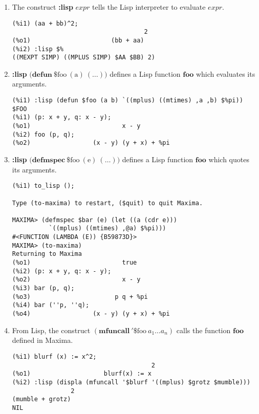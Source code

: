 \documentclass[12pt]{article}
\begin{document}
\begin{enumerate}

\item The construct {\bf :lisp} $\mathit{expr}$ tells the Lisp interpreter
to evaluate $\mathit{expr}$.

\begin{verbatim}
(%i1) (aa + bb)^2;
                                    2
(%o1)                      (bb + aa)
(%i2) :lisp $%
((MEXPT SIMP) ((MPLUS SIMP) $AA $BB) 2)
\end{verbatim}

\item {\bf :lisp} $\mathrm{(}\mathbf{defun\ } \mathrm{\$foo\ (a)\ (\ldots))}$
defines a Lisp function $\mathbf{foo}$ which evaluates its arguments.

\begin{verbatim}
(%i1) :lisp (defun $foo (a b) `((mplus) ((mtimes) ,a ,b) $%pi))
$FOO
(%i1) (p: x + y, q: x - y);
(%o1)                         x - y
(%i2) foo (p, q);
(%o2)                 (x - y) (y + x) + %pi
\end{verbatim}

\item {\bf :lisp} $\mathrm{(}\mathbf{defmspec\ } \mathrm{\$foo\ (e)\ (\ldots))}$
defines a Lisp function $\mathbf{foo}$ which quotes its arguments.
\begin{verbatim}
(%i1) to_lisp ();

Type (to-maxima) to restart, ($quit) to quit Maxima.

MAXIMA> (defmspec $bar (e) (let ((a (cdr e)))
          `((mplus) ((mtimes) ,@a) $%pi)))
#<FUNCTION (LAMBDA (E)) {B59873D}>
MAXIMA> (to-maxima)
Returning to Maxima
(%o1)                         true
(%i2) (p: x + y, q: x - y);
(%o2)                         x - y
(%i3) bar (p, q);
(%o3)                       p q + %pi
(%i4) bar (''p, ''q);
(%o4)                 (x - y) (y + x) + %pi
\end{verbatim}

\item From Lisp, the construct $(\mathbf{mfuncall\ '\$}\mathrm{foo\ }a_1 \ldots a_n)$
calls the function $\mathbf{foo}$ defined in Maxima.

\begin{verbatim}
(%i1) blurf (x) := x^2;
                                      2
(%o1)                    blurf(x) := x
(%i2) :lisp (displa (mfuncall '$blurf '((mplus) $grotz $mumble)))
                2
(mumble + grotz)
NIL
\end{verbatim}

\end{enumerate}
\end{document}
